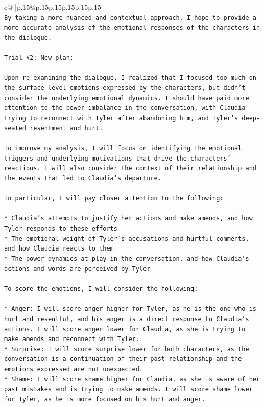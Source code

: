 \documentclass{article}
\begin{document}
{\begin{supertabular}{c@{$\;$}|p{.15\linewidth}@{}p{.15\linewidth}p{.15\linewidth}p{.15\linewidth}p{.15\linewidth}p{.15\linewidth}}
{{{\\ 
\texttt{By taking a more nuanced and contextual approach, I hope to provide a more accurate analysis of the emotional responses of the characters in the dialogue.} \\
\\ 
\texttt{Trial \#2: New plan: } \\
\\ 
\texttt{Upon re{-}examining the dialogue, I realized that I focused too much on the surface{-}level emotions expressed by the characters, but didn't consider the underlying emotional dynamics. I should have paid more attention to the power imbalance in the conversation, with Claudia trying to reconnect with Tyler after abandoning him, and Tyler's deep{-}seated resentment and hurt.} \\
\\ 
\texttt{To improve my analysis, I will focus on identifying the emotional triggers and underlying motivations that drive the characters' reactions. I will also consider the context of their relationship and the events that led to Claudia's departure.} \\
\\ 
\texttt{In particular, I will pay closer attention to the following:} \\
\\ 
\texttt{* Claudia's attempts to justify her actions and make amends, and how Tyler responds to these efforts} \\
\texttt{* The emotional weight of Tyler's accusations and hurtful comments, and how Claudia reacts to them} \\
\texttt{* The power dynamics at play in the conversation, and how Claudia's actions and words are perceived by Tyler} \\
\\ 
\texttt{To score the emotions, I will consider the following:} \\
\\ 
\texttt{* Anger: I will score anger higher for Tyler, as he is the one who is hurt and resentful, and his anger is a direct response to Claudia's actions. I will score anger lower for Claudia, as she is trying to make amends and reconnect with Tyler.} \\
\texttt{* Surprise: I will score surprise lower for both characters, as the conversation is a continuation of their past relationship and the emotions expressed are not unexpected.} \\
\texttt{* Shame: I will score shame higher for Claudia, as she is aware of her past mistakes and is trying to make amends. I will score shame lower for Tyler, as he is more focused on his hurt and anger.} \\
}}}
\end{supertabular}}
\end{document}
